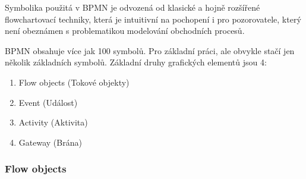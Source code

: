 \documentclass[]{article}
\begin{document}
Symbolika použitá v BPMN je odvozená od klasické a hojně rozšířené flowchartovací techniky, která je intuitivní na pochopení i pro pozorovatele, který není obeznámen s problematikou modelování obchodních procesů.

BPMN obsahuje více jak 100 symbolů. Pro základní práci, ale obvykle stačí jen několik základních symbolů. Základní druhy grafických elementů jsou 4: \cite{Dumas2013}

\begin{enumerate}
\item Flow objects (Tokové objekty)
\item Event (Událost)
\item Activity (Aktivita)
\item Gateway (Brána)
\end{enumerate}

\subsubsection{Flow objects}


\nocite{*}


\end{document}
